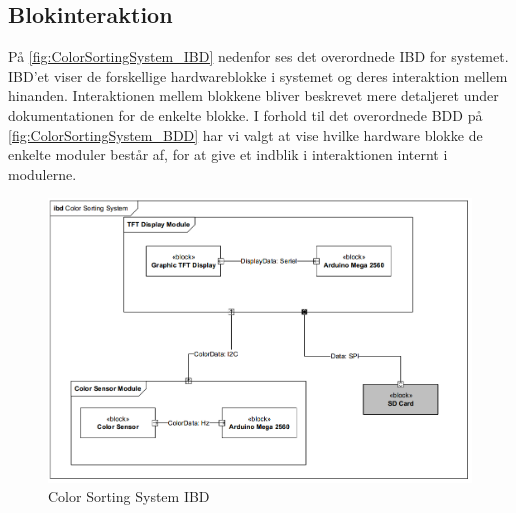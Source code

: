 \subsection{Blokinteraktion}

På \autoref{fig:ColorSortingSystem_IBD} nedenfor ses det overordnede IBD for systemet. IBD’et viser de forskellige hardwareblokke i systemet og deres interaktion mellem hinanden. Interaktionen mellem blokkene bliver beskrevet mere detaljeret under dokumentationen for de enkelte blokke. I forhold til det overordnede BDD på \autoref{fig:ColorSortingSystem_BDD} har vi valgt at vise hvilke hardware blokke de enkelte moduler består af, for at give et indblik i interaktionen internt i modulerne. 

\begin{figure}[H]
	\centering
	\includegraphics[width = 500pt]{Img/ColorSortingSystem_IBD.png}
	\caption{Color Sorting System IBD}
	\label{fig:ColorSortingSystem_IBD}
\end{figure}